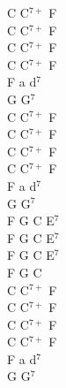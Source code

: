 \documentclass[a5paper, 10pt]{book}
\begin{document}
\begin{minipage}[t]{0.2\textwidth}
C C$^{7+}$ F\\
C C$^{7+}$ F\\
C C$^{7+}$ F\\
C C$^{7+}$ F\\
F a d$^7$\\
G G$^7$\\

C C$^{7+}$ F\\
C C$^{7+}$ F\\
C C$^{7+}$ F\\
C C$^{7+}$ F\\
F a d$^7$\\
G G$^7$\\

F G C E$^7$\\
F G C E$^7$\\
F G C E$^7$\\
F G C\\

C C$^{7+}$ F\\
C C$^{7+}$ F\\
C C$^{7+}$ F\\
C C$^{7+}$ F\\
F a d$^7$\\
G G$^7$\\
\end{minipage}

\newpage
\end{document}

